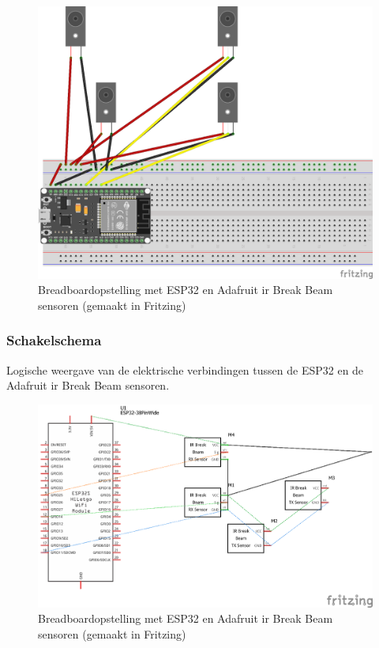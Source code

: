 \begin{figure}[htbp]
    \centering
    \includegraphics[width=13.5cm]{img/bp/wachtruimtes/technische_uitwerking/fritzing.png}
    \caption{Breadboardopstelling met ESP32 en Adafruit \gls{ir} Break Beam sensoren (gemaakt in Fritzing)}
    \label{fig:breadboard}
\end{figure}

\subsubsection{Schakelschema}
Logische weergave van de elektrische verbindingen tussen de ESP32 en de Adafruit \gls{ir} Break Beam sensoren.


\begin{figure}[htbp]
    \centering
    \includegraphics[width=\textwidth]{img/bp/wachtruimtes/technische_uitwerking/schakelschema.png}
    \caption{Breadboardopstelling met ESP32 en Adafruit \gls{ir} Break Beam sensoren (gemaakt in Fritzing)}
    \label{fig:schakelschema}
\end{figure}

